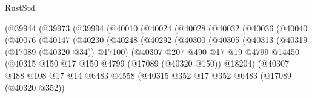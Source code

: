 \begin{lexlean}{RustStd}
\begin{coremodule}
                      (@39944
                        (@39973
                          (@39994
                            (@40010
                              (@40024
                                (@40028
                                  (@40032
                                    (@40036
                                      (@40040
                                        (@40076
                                          (@40147
                                            (@40230
                                              (@40248
                                                (@40292
                                                  (@40300
                                                    (@40305
                                                      (@40313
                                                        (@40319 (@17089 (@40320 @34)) @17100)
                                                        (@40307
                                                          @207
                                                          @490
                                                          @17
                                                          @19
                                                          @4799
                                                          @14450
                                                          (@40315
                                                            @150
                                                            @17
                                                            @150
                                                            @4799
                                                            (@17089 (@40320 @150))
                                                            @18204)
                                                          (@40307
                                                            @488
                                                            @108
                                                            @17
                                                            @14
                                                            @6483
                                                            @4558
                                                            (@40315
                                                              @352
                                                              @17
                                                              @352
                                                              @6483
                                                              (@17089 (@40320 @352))

\end{coremodule}
\end{lexlean}
